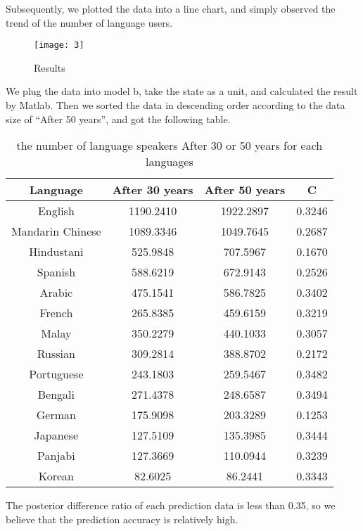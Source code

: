 \documentclass{mcmthesis}
\begin{document}
Subsequently, we plotted the data into a line chart, and simply observed the trend of the number of language users.
\begin{figure}[!hb]
  \centering
  \texttt{[image: 3]}
  \caption{Results}
  \label{Res}
\end{figure}

We plug the data into model b, take the state as a unit, and calculated the result by Matlab. Then we sorted the data in descending order according to the data size of “After 50 years”, and got the following table.
\begin{table}[!ht]
  \centering
  \begin{tabular}{ c | c | c | c }
    \hline
    Language & After 30 years & After 50 years & C \\ \hline
    English & 1190.2410 & 1922.2897 & 0.3246\\  \hline
    Mandarin Chinese & 1089.3346 & 1049.7645 & 0.2687 \\ \hline
    Hindustani & 525.9848 & 707.5967 & 0.1670 \\  \hline
    Spanish & 588.6219 & 672.9143 & 0.2526 \\  \hline
    Arabic & 475.1541 & 586.7825 & 0.3402 \\  \hline
    French & 265.8385 & 459.6159 & 0.3219\\  \hline
    Malay & 350.2279 & 440.1033 & 0.3057 \\  \hline
    Russian & 309.2814 & 388.8702 & 0.2172  \\  \hline
    Portuguese & 243.1803 & 259.5467 & 0.3482  \\  \hline
    Bengali & 271.4378 & 248.6587 & 0.3494 \\  \hline
    German & 175.9098 & 203.3289 & 0.1253  \\  \hline
    Japanese & 127.5109 & 135.3985 & 0.3444  \\  \hline
    Panjabi & 127.3669 & 110.0944 & 0.3239  \\  \hline
    Korean & 82.6025 & 86.2441 & 0.3343  \\  \hline
    \end{tabular}
  \caption{the number of language speakers After 30 or 50 years for each languages}
  \label{the number of language speakers After 30 or 50 years for each languages}
\end{table}

The posterior difference ratio of each prediction data is less than 0.35, so we believe that the prediction accuracy is relatively high.
\end{document}
